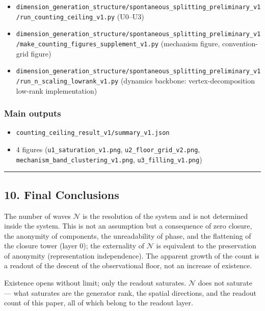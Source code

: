 \documentclass[
  a4paper,
]{article}
\providecommand{\tightlist}{%
  \setlength{\itemsep}{0pt}\setlength{\parskip}{0pt}}
\begin{document}
\begin{itemize}
\tightlist
\item
  \texttt{dimension\_generation\_structure/spontaneous\_splitting\_preliminary\_v1/run\_counting\_ceiling\_v1.py}
  (U0--U3)
\item
  \texttt{dimension\_generation\_structure/spontaneous\_splitting\_preliminary\_v1/make\_counting\_figures\_supplement\_v1.py}
  (mechanism figure, convention-grid figure)
\item
  \texttt{dimension\_generation\_structure/spontaneous\_splitting\_preliminary\_v1/run\_n\_scaling\_lowrank\_v1.py}
  (dynamics backbone: vertex-decomposition low-rank implementation)
\end{itemize}

\subsubsection{Main outputs}\label{main-outputs}

\begin{itemize}
\tightlist
\item
  \texttt{counting\_ceiling\_result\_v1/summary\_v1.json}
\item
  4 figures (\texttt{u1\_saturation\_v1.png},
  \texttt{u2\_floor\_grid\_v2.png},
  \texttt{mechanism\_band\_clustering\_v1.png},
  \texttt{u3\_filling\_v1.png})
\end{itemize}

\begin{center}\rule{0.5\linewidth}{0.5pt}\end{center}

\subsection{10. Final Conclusions}\label{final-conclusions}

The number of waves \(\mathcal N\) is the resolution of the system and
is not determined inside the system. This is not an assumption but a
consequence of zero closure, the anonymity of components, the
unreadability of phase, and the flattening of the closure tower (layer
0); the externality of \(\mathcal N\) is equivalent to the preservation
of anonymity (representation independence). The apparent growth of the
count is a readout of the descent of the observational floor, not an
increase of existence.

Existence opens without limit; only the readout saturates.
\(\mathcal N\) does not saturate --- what saturates are the generator
rank, the spatial directions, and the readout count of this paper, all
of which belong to the readout layer.
\end{document}
